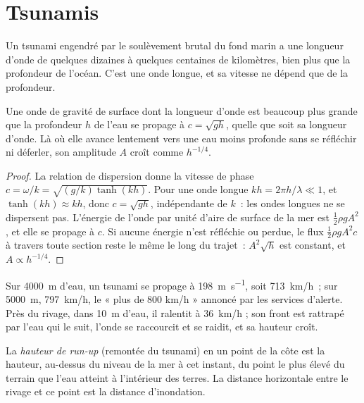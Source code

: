 \section{Tsunamis}\label{sec:b2:geological-hazards:tsunamis}

Un tsunami engendré par le soulèvement brutal du fond marin a une longueur d'onde
de quelques dizaines à quelques centaines de kilomètres, bien plus que la profondeur
de l'océan. C'est une onde longue, et sa vitesse ne dépend que de la profondeur.

\begin{proposition}\label{prop:b2:geological-hazards:long-waves}
Une onde de gravité de surface dont la longueur d'onde est beaucoup plus grande que la profondeur $h$
de l'eau se propage à $c = \sqrt{gh}$, quelle que soit sa longueur d'onde. Là où elle avance lentement
vers une eau moins profonde sans se réfléchir ni déferler, son amplitude $A$ croît comme $h^{-1/4}$.
\end{proposition}

\begin{proof}
La relation de dispersion donne la vitesse de phase $c = \omega/k = \sqrt{(g/k)\tanh(kh)}$. Pour une onde longue
$kh = 2\pi h/\lambda \ll 1$, et $\tanh(kh) \approx kh$, donc $c = \sqrt{gh}$, indépendante de
$k$~: les ondes longues ne se dispersent pas. L'énergie de l'onde par unité d'aire de surface de la mer est $\frac12
\rho g A^2$, et elle se propage à $c$. Si aucune énergie n'est réfléchie ou perdue, le flux $\frac12\rho g A^2
c$ à travers toute section reste le même le long du trajet~: $A^2 \sqrt{h}$ est constant, et $A \propto
h^{-1/4}$.
\end{proof}

Sur \qty{4000}{m} d'eau, un tsunami se propage à \qty{198}{m.s^{-1}}, soit
\qty{713}{km/h}~; sur \qty{5000}{m}, \qty{797}{km/h}, le « plus de 800 km/h » annoncé par les services
d'alerte. Près du rivage, dans \qty{10}{m} d'eau, il ralentit à \qty{36}{km/h} ; son front
est rattrapé par l'eau qui le suit, l'onde se raccourcit et se raidit, et sa hauteur croît.

\begin{definition}\label{def:b2:geological-hazards:tsunami}
La \emph{hauteur de run-up} (remontée du tsunami) en un point de la côte est la
hauteur, au-dessus du niveau de la mer à cet instant, du point le plus élevé du terrain que l'eau atteint
à l'intérieur des terres. La distance horizontale entre le rivage et ce point est la distance d'inondation.
\end{definition}

